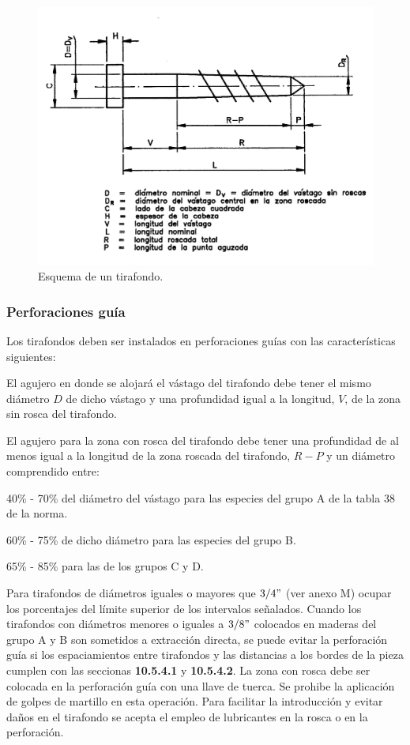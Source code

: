\begin{figure}[H]
\centering
\includegraphics[width=0.9\linewidth]{Imagenes/figura_28.pdf}%
\caption{Esquema de un tirafondo. \cite{nch1198}}
\label{fig:nch_28}
\end{figure}

\subsubsection{Perforaciones guía}
Los tirafondos deben ser instalados en perforaciones guías con las características siguientes:
\begin{itemize*}
	\item El agujero en donde se alojará el vástago del tirafondo debe tener el mismo diámetro $D$ de dicho vástago y una profundidad igual a la longitud, $V$, de la zona sin rosca del tirafondo.
	\item El agujero para la zona con rosca del tirafondo debe tener una profundidad de al menos igual a la longitud de la zona roscada del tirafondo, $R-P$ y un diámetro comprendido entre:
	\begin{itemize*}
		\item 40\% - 70\% del diámetro del vástago para las especies del grupo A de la tabla 38 de la norma.
		\item 60\% - 75\% de dicho diámetro para las especies del grupo B.
		\item 65\% - 85\% para las de los grupos C y D.
	\end{itemize*}
\end{itemize*}
Para tirafondos de diámetros iguales o mayores que $3/4"$ (ver anexo M) ocupar los porcentajes del límite superior de los intervalos señalados. Cuando los tirafondos con diámetros menores o iguales a $3/8"$ colocados en maderas del grupo A y B son sometidos a extracción directa, se puede evitar la perforación guía si los espaciamientos entre tirafondos y las distancias a los bordes de la pieza cumplen con las seccionas \textbf{10.5.4.1} y \textbf{10.5.4.2}.
La zona con rosca debe ser colocada en la perforación guía con una llave de tuerca. Se prohibe la aplicación de golpes de martillo en esta operación. Para facilitar la introducción y evitar daños en el tirafondo se acepta el empleo de lubricantes en la rosca o en la perforación.

